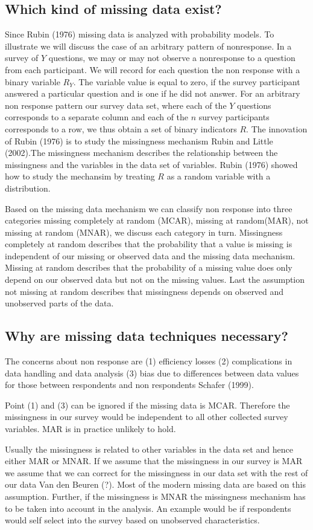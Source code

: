 \subsection{Which kind of missing data exist?} 
Since Rubin (1976) missing data is analyzed with probability models. 
To illustrate we will discuss the case of an arbitrary pattern of nonresponse.
In a survey of $Y$ questions, we may or may not observe a nonresponse to a question from each participant. 
We will record for each question the non response with a binary variable $R_Y$. 
The variable value is equal to zero, if the survey participant answered a particular question and is one if he did not answer. 
For an arbitrary non response pattern our  survey data set, where each of the $Y$ questions corresponds to a separate column and each of the $n$ survey participants corresponds to a row, we thus obtain a set of binary indicators $R$.
The innovation of Rubin (1976) is to study the missingness mechanism Rubin and Little (2002).The missingness mechanism describes the relationship between the missingness and the variables in the data set of variables. Rubin (1976) showed how to study the mechansim by treating $R$ as a random variable with a distribution. \par
Based on the missing data mechanism we can classify non response into three categories missing completely at random (MCAR), missing at random(MAR),  not missing at random (MNAR), we discuss each category in turn.  Missingness completely at random describes that the probability that a value is missing is independent of our missing or observed data and the missing data mechanism. 
Missing at random describes that the probability of a missing value does only depend on our observed data but not on the missing values. 
Last the assumption not missing at random describes that missingness depends on observed and unobserved parts of the data. \par
\subsection{Why are missing data techniques necessary?}
The concerns about non response are (1) efficiency losses (2) complications in data handling and data analysis (3) bias due to differences between data values for those between respondents and non respondents  Schafer (1999). \par 
Point (1) and (3)  can be ignored if the missing data is MCAR. 
Therefore the missingness in our survey would be independent to all other collected survey variables. MAR is in practice unlikely to hold. \par 
Usually the missingness is related to other variables in the data set and hence either MAR or MNAR. 
If we assume that the missingness in our survey is  MAR we assume that we can correct for the missingness in our data set with the rest of our data Van den Beuren (?).  Most of the modern missing data are based on this assumption. Further, if the missingness is MNAR the missingness mechanism has to be taken into account in the analysis. An example would be if respondents would self select into the survey based on unobserved characteristics. 
